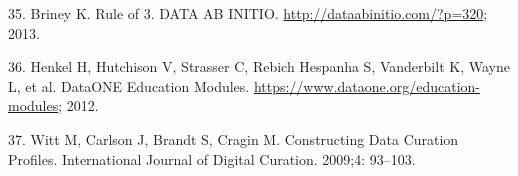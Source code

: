 \documentclass[10pt,letterpaper]{article}
\begin{document}
35. Briney K. Rule of 3. DATA AB INITIO.
\url{http://dataabinitio.com/?p=320}; 2013.

36. Henkel H, Hutchison V, Strasser C, Rebich Hespanha S, Vanderbilt K,
Wayne L, et al. DataONE Education Modules.
\url{https://www.dataone.org/education-modules}; 2012.

37. Witt M, Carlson J, Brandt S, Cragin M. Constructing Data Curation
Profiles. International Journal of Digital Curation. 2009;4: 93--103.






%
%
%
\end{document}
